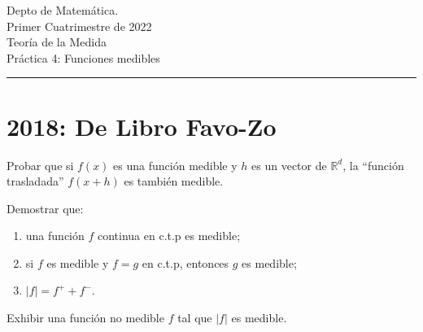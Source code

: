 \documentclass{book}
\newcommand{\rr}{\mathbb{R}}
\begin{document}


\begin{large}
\begin{bfseries} %
        \noindent Depto de Matem\'atica.\\
        Primer Cuatrimestre de 2022\\                                                                                                                                                                                                                                                                                                                                                
        Teoría de la Medida \\
        Práctica 4: Funciones medibles

\end{bfseries}
\end{large}
\par\noindent\rule{\textwidth}{.5pt}









\section{2018: De Libro Favo-Zo}






\begin{ejer}{} 
Probar que si $f(x)$ es una función medible y $h$ es un vector de $\rr^d$, la ``función 
trasladada'' $f(x+h)$ es también medible.
\end{ejer}

\begin{ejer}{} 
 Demostrar que: 
	\begin{enumerate}
\item una función $f$ continua en c.t.p es medible;
\item si $f$ es medible y $f=g$ en c.t.p, entonces $g$ es medible;
\item $|f|=f^{+}+f^{-}$.
	\end{enumerate}
	\end{ejer}


\begin{ejer}{} 
Exhibir una función no medible $f$ tal que $|f|$ es medible.
\end{ejer}
\end{document}
